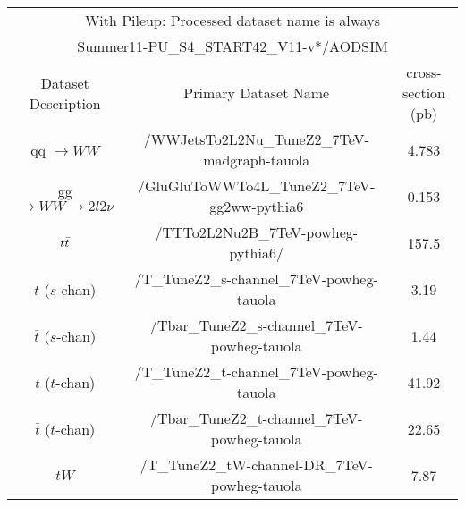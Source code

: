 \begin{table}[!ht]
\begin{center}
{\footnotesize
\begin{tabular}{|c|c|c|}
\hline
\multicolumn{3}{|c|}{With Pileup: Processed dataset name is always} \\
\multicolumn{3}{|c|}{Summer11-PU\_S4\_START42\_V11-v*/AODSIM} \\
\hline
 Dataset Description                     &   Primary Dataset Name   & cross-section (pb)\\
\hline
qq $\rightarrow WW$                  	 &   /WWJetsTo2L2Nu\_TuneZ2\_7TeV-madgraph-tauola                      &  4.783 \\
gg $\rightarrow WW \to 2l 2\nu$          &   /GluGluToWWTo4L\_TuneZ2\_7TeV-gg2ww-pythia6                       &   0.153\\
$t\bar{t}$                              	 &   /TTTo2L2Nu2B\_7TeV-powheg-pythia6/                                &  157.5 \\
$t$ ($s$-chan)                 	 	 &   /T\_TuneZ2\_s-channel\_7TeV-powheg-tauola                         &  3.19 \\
$\bar{t}$ ($s$-chan)                 	 &   /Tbar\_TuneZ2\_s-channel\_7TeV-powheg-tauola                      &  1.44 \\
$t$ ($t$-chan)             	 	 &   /T\_TuneZ2\_t-channel\_7TeV-powheg-tauola                         &  41.92 \\
$\bar{t}$ ($t$-chan)                 	 &   /Tbar\_TuneZ2\_t-channel\_7TeV-powheg-tauola                      &  22.65 \\
$tW$                                     &   /T\_TuneZ2\_tW-channel-DR\_7TeV-powheg-tauola                     &  7.87 \\

\end{tabular}}
\end{center}
\end{table}
